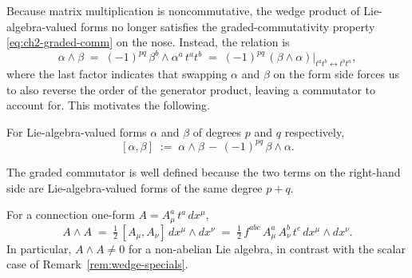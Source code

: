 \medskip

\noindent Because matrix multiplication is noncommutative, the wedge product of Lie-algebra-valued forms no longer satisfies the graded-commutativity property \eqref{eq:ch2-graded-comm} on the nose. Instead, the relation is
\begin{equation}\label{eq:lie-graded-comm}
\alpha \wedge \beta \;=\; (-1)^{pq}\, \beta^b \wedge \alpha^a\, t^a t^b \;=\; (-1)^{pq}\,(\beta \wedge \alpha)\bigr|_{t^a t^b \leftrightarrow t^b t^a},
\end{equation}
where the last factor indicates that swapping $\alpha$ and $\beta$ on the form side forces us to also reverse the order of the generator product, leaving a commutator to account for. This motivates the following.

\begin{definition}\label{def:graded-commutator}
For Lie-algebra-valued forms $\alpha$ and $\beta$ of degrees $p$ and $q$ respectively,
\begin{equation}\label{eq:graded-commutator-def}
[\alpha, \beta] \;:=\; \alpha \wedge \beta \,-\, (-1)^{pq}\, \beta \wedge \alpha.
\end{equation}
\end{definition}

\noindent The graded commutator is well defined because the two terms on the right-hand side are Lie-algebra-valued forms of the same degree $p+q$.

\begin{proposition}\label{prop:AwedgeA}
For a connection one-form $A = A_\mu^a\, t^a\, dx^\mu$,
\begin{equation}\label{eq:AwedgeA}
A \wedge A \;=\; \tfrac{1}{2}\,[A_\mu, A_\nu]\, dx^\mu \wedge dx^\nu \;=\; \tfrac{1}{2}\, f^{abc}\, A_\mu^a\, A_\nu^b\, t^c\, dx^\mu \wedge dx^\nu.
\end{equation}
In particular, $A \wedge A \neq 0$ for a non-abelian Lie algebra, in contrast with the scalar case of Remark~\ref{rem:wedge-specials}.
\end{proposition}

